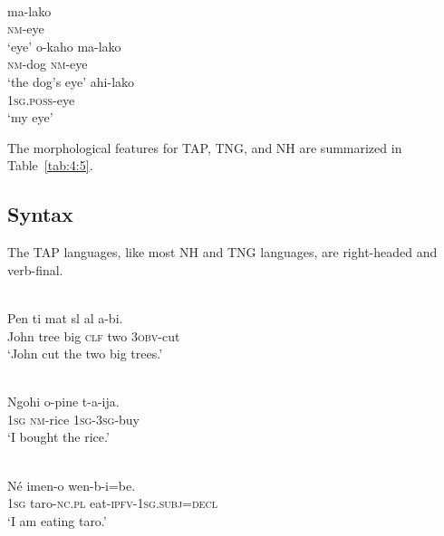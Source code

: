 \ea%
\label{ex:4:24}
 \\
\ea
  \gll ma-lako \\
    \textsc{nm}-eye  \\
\glt `eye' 
    \ex
    \gll o-kaho ma-lako \\
    \textsc{nm}-dog \textsc{nm}-eye\\
\glt `the dog's eye'
    \ex
    \gll ahi-lako\\
    \textsc{1sg.poss}-eye\\
\glt `my eye'
  \z
\z

The morphological features for TAP, TNG, and NH are summarized in Table~\ref{tab:4:5}.




\subsection{Syntax} \label{sec:4:2.3}
The TAP languages, like most NH and TNG \citep{Foley2000} languages, are right-headed and verb-final.


\ea%
\label{ex:4:25}
 \\
\gll  Pen ti mat{\textepsilon} s{\textepsilon}l al{\textopeno} {\textglotstop}a-b{\textopeno}{\textglotstop}{\textopeno}i. \\
   John tree big \textsc{clf} two 3\textsc{obv}-cut \\
\glt `John cut the two big trees.'
\z





\ea%
\label{ex:4:26}
 \\
\gll  Ngohi o-pine t-a-ija. \\
 \textsc{1sg} \textsc{nm}-rice \textsc{1sg-3sg}-buy  \\
\glt `I bought the rice.'
\z






\ea%
\label{ex:4:27}
 \\
\gll  N\'e imen-o wen-b-i=be. \\
 \textsc{1sg} taro-\textsc{nc.pl} eat-\textsc{ipfv-1sg.subj=decl}  \\
\glt `I am eating taro.'
\z





